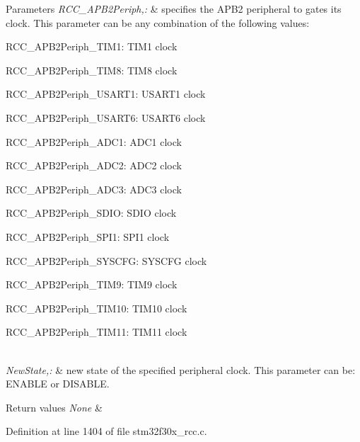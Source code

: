 \begin{DoxyParams}{Parameters}
{\em R\-C\-C\-\_\-\-A\-P\-B2\-Periph,\-:} & specifies the A\-P\-B2 peripheral to gates its clock. This parameter can be any combination of the following values\-: \begin{DoxyItemize}
\item R\-C\-C\-\_\-\-A\-P\-B2\-Periph\-\_\-\-T\-I\-M1\-: T\-I\-M1 clock \item R\-C\-C\-\_\-\-A\-P\-B2\-Periph\-\_\-\-T\-I\-M8\-: T\-I\-M8 clock \item R\-C\-C\-\_\-\-A\-P\-B2\-Periph\-\_\-\-U\-S\-A\-R\-T1\-: U\-S\-A\-R\-T1 clock \item R\-C\-C\-\_\-\-A\-P\-B2\-Periph\-\_\-\-U\-S\-A\-R\-T6\-: U\-S\-A\-R\-T6 clock \item R\-C\-C\-\_\-\-A\-P\-B2\-Periph\-\_\-\-A\-D\-C1\-: A\-D\-C1 clock \item R\-C\-C\-\_\-\-A\-P\-B2\-Periph\-\_\-\-A\-D\-C2\-: A\-D\-C2 clock \item R\-C\-C\-\_\-\-A\-P\-B2\-Periph\-\_\-\-A\-D\-C3\-: A\-D\-C3 clock \item R\-C\-C\-\_\-\-A\-P\-B2\-Periph\-\_\-\-S\-D\-I\-O\-: S\-D\-I\-O clock \item R\-C\-C\-\_\-\-A\-P\-B2\-Periph\-\_\-\-S\-P\-I1\-: S\-P\-I1 clock \item R\-C\-C\-\_\-\-A\-P\-B2\-Periph\-\_\-\-S\-Y\-S\-C\-F\-G\-: S\-Y\-S\-C\-F\-G clock \item R\-C\-C\-\_\-\-A\-P\-B2\-Periph\-\_\-\-T\-I\-M9\-: T\-I\-M9 clock \item R\-C\-C\-\_\-\-A\-P\-B2\-Periph\-\_\-\-T\-I\-M10\-: T\-I\-M10 clock \item R\-C\-C\-\_\-\-A\-P\-B2\-Periph\-\_\-\-T\-I\-M11\-: T\-I\-M11 clock \end{DoxyItemize}
\\
\hline
{\em New\-State,\-:} & new state of the specified peripheral clock. This parameter can be\-: E\-N\-A\-B\-L\-E or D\-I\-S\-A\-B\-L\-E. \\
\hline
\end{DoxyParams}

\begin{DoxyRetVals}{Return values}
{\em None} & \\
\hline
\end{DoxyRetVals}


Definition at line 1404 of file stm32f30x\-\_\-rcc.\-c.

